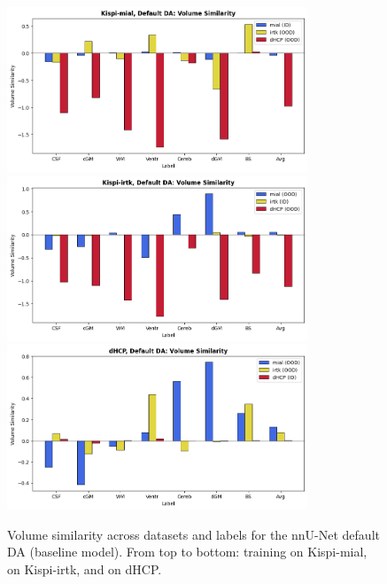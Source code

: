 \begin{figure}[htbp]
    \centering
    \includegraphics[width=0.8\textwidth]{figures/mial_default_VS.png}\\
    \vspace{10pt}
    \includegraphics[width=0.8\textwidth]{figures/irtk_default_VS.png}\\
    \vspace{10pt}
    \includegraphics[width=0.8\textwidth]{figures/dHCP_default_VS.png}
    \caption{Volume similarity across datasets and labels for the nnU-Net default DA (baseline model). From top to bottom: training on Kispi-mial, on Kispi-irtk, and on dHCP.}
    \label{fig:default_VS}
\end{figure}

